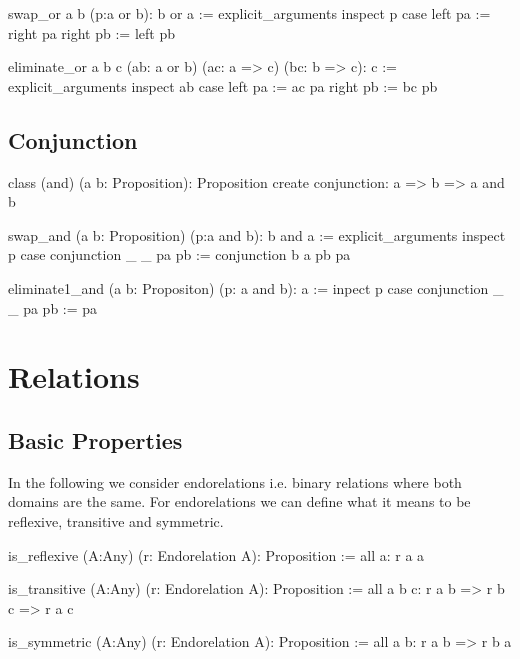 \begin{alba}
  swap_or a b (p:a or b): b or a :=
    explicit_arguments
      inspect
        p
      case
        left  pa := right pa
        right pb := left  pb
\end{alba}

\begin{alba}
  eliminate_or a b c (ab: a or b) (ac: a => c) (bc: b => c): c :=
    explicit_arguments
      inspect
        ab
      case
        left  pa :=
          ac pa
        right pb :=
          bc pb
\end{alba}


\subsection{Conjunction}

\begin{alba}
  class
    (and) (a b: Proposition): Proposition
  create
    conjunction: a => b => a and b
\end{alba}


\begin{alba}
  swap_and (a b: Proposition) (p:a and b): b and a :=
    explicit_arguments
      inspect
        p
      case
        conjunction _ _ pa pb := conjunction b a pb pa
\end{alba}


\begin{alba}
  eliminate1_and (a b: Propositon) (p: a and b): a :=
    inpect p case
      conjunction _ _ pa pb := pa
\end{alba}







\newpage
\section{Relations}
\label{sec:certprog-relations}


\subsection{Basic Properties}


In the following we consider endorelations i.e. binary relations where both
domains are the same. For endorelations we can define what it means to be
reflexive, transitive and symmetric.

\begin{alba}
  is_reflexive (A:Any) (r: Endorelation A): Proposition :=
    all a: r a a

  is_transitive (A:Any) (r: Endorelation A): Proposition :=
    all a b c: r a b => r b c => r a c

  is_symmetric (A:Any) (r: Endorelation A): Proposition :=
    all a b: r a b => r b a
\end{alba}


